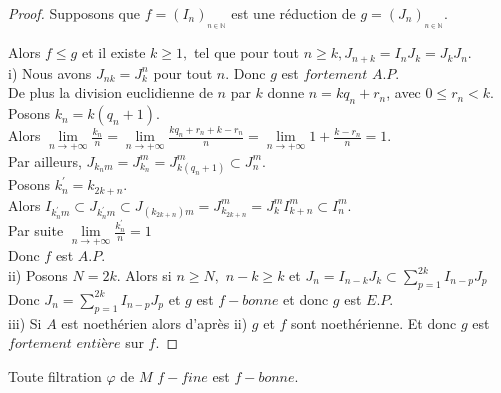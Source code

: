 \begin{proof}
	Supposons que $f=(I_{n})_{_{n\in \mathbb{N}}}$ est une réduction de $g=(J_{n})_{_{n\in \mathbb{N}}}.$
	
	Alors $f\leq g$ et il existe $k\geq 1,$ tel que pour tout $n\geq k,J_{n+k}=I_{n}J_{k}=J_{k}J_{n}$.\\
	i) Nous avons $J_{nk}=J_{k}^{n}$ pour tout $n.$ Donc $g$ est $fortement$ $A.P.$\\
	De plus la division euclidienne de $n$ par $k$ donne $n=kq_{n}+r_{n}$, avec $0\leq r_{n}<k.$\\
	Posons $k_{n}=k(q_{n}+1).$\\
	Alors $\underset{n\longrightarrow +\infty }{\lim }\frac{k_{n}}{n}=\underset{n\longrightarrow +\infty }{\lim }\frac{kq_{n}+r_{n}+k-r_{n}}{n}=\underset{n\longrightarrow +\infty }{\lim}1+\frac{k-r_{n}}{n}=1.$\\
	Par ailleurs, $J_{k_{n}m}=J_{k_{n}}^{m}=J_{k(q_{n}+1)}^{m}\subset J_{n}^{m}.$\\
	Posons $k_{n}^{\prime }=k_{2k+n}.$\\
	Alors $I_{k_{n}^{\prime }m}\subset J_{k_{n}^{\prime }m}\subset J_{(k_{2k+n})m}=J_{k_{2k+n}}^{m}=J_{k}^{m}I_{k+n}^{m}\subset I_{n}^{m}.$\\
	Par suite $\underset{n\longrightarrow +\infty }{\lim }\frac{k_{n}^{\prime }}{n}=1$\\
	Donc $f$ est $A.P.$\\
	ii) Posons $N=2k.$ Alors si $n\geq N,$ $n-k\geq k$ et $J_{n}=I_{n-k}J_{k}\subset \sum\limits_{p=1}^{2k}I_{n-p}J_{p}$\\
	Donc $J_{n}=\sum\limits_{p=1}^{2k}I_{n-p}J_{p}$ et $g$ est $f-bonne$ et donc $g$ est $E.P.$\\
	iii) Si $A$ est noethérien alors d'après ii) $g$ et $f$ sont noethérienne. Et donc $g$ est $fortement$ $entière$ sur $f.$
\end{proof}
\begin{maproposition}
	\label{maprop3}
	Toute filtration $\varphi$ de $M$ $f-fine$ est $f-bonne$.
\end{maproposition}
